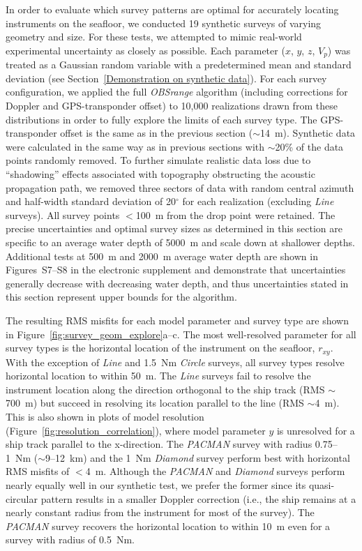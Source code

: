 In order to evaluate which survey patterns are optimal for accurately locating instruments on the seafloor, we conducted 19 synthetic surveys of varying geometry and size. For these tests, we attempted to mimic real-world experimental uncertainty as closely as possible. Each parameter ($x$, $y$, $z$, $V_p$) was treated as a Gaussian random variable with a predetermined mean and standard deviation
(see Section~\ref{Demonstration on synthetic data}). For each survey configuration, we applied the full \textit{OBSrange} algorithm (including corrections for Doppler and GPS-transponder offset) to 10,000 realizations drawn from these distributions in order to fully explore the limits of each survey type. The GPS-transponder offset is the same as in the previous section ($\sim$14~m). Synthetic data were calculated in the same way as in previous sections with $\sim$20\% of the data points randomly removed. To further simulate realistic data loss due to ``shadowing'' effects associated with topography obstructing the acoustic propagation path, we removed three sectors of data with random central azimuth and half-width standard deviation of 20$^{\circ}$ for each realization (excluding \textit{Line} surveys). All survey points $<$100~m from the drop point were retained. The precise uncertainties and optimal survey sizes as determined in this section are specific to an average water depth of 5000~m and scale down at shallower depths. Additional tests at 500~m and 2000~m average water depth are shown in Figures~S7--S8 in the electronic supplement and demonstrate that uncertainties generally decrease with decreasing water depth, and thus uncertainties stated in this section represent upper bounds for the algorithm.

The resulting RMS misfits for each model parameter and survey type are shown in Figure~\ref{fig:survey_geom_explore}a--c. The most well-resolved parameter for all survey types is the horizontal location of the instrument on the seafloor, $r_{xy}$. With the exception of \textit{Line} and 1.5~Nm \textit{Circle} surveys, all survey types resolve horizontal location to within 50~m. The \textit{Line} surveys fail to resolve the instrument location along the direction orthogonal to the ship track (RMS $\sim$700~m) but succeed in resolving its location parallel to the line (RMS $\sim$4~m). This is also shown in plots of model resolution (Figure~\ref{fig:resolution_correlation}), where model parameter $y$ is unresolved for a ship track parallel to the x-direction. The \textit{PACMAN} survey with radius 0.75--1~Nm ($\sim$9--12~km) and the 1~Nm \textit{Diamond} survey perform best with horizontal RMS misfits of $<$4~m. Although the \textit{PACMAN} and \textit{Diamond} surveys perform nearly equally well in our synthetic test, we prefer the former since its quasi-circular pattern results in a smaller Doppler correction (i.e., the ship remains at a nearly constant radius from the instrument for most of the survey). The \textit{PACMAN} survey recovers the horizontal location to within 10~m even for a survey with radius of 0.5~Nm.

